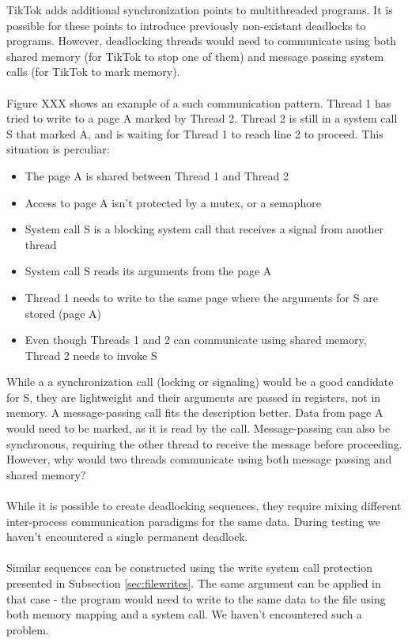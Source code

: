 \documentclass[conference]{IEEEtran}
\begin{document}
TikTok adds additional synchronization points to multithreaded programs. It is possible for these points to introduce 
previously non-existant deadlocks to programs. However, deadlocking threads would need to communicate using both 
shared memory (for TikTok to stop one of them) and message passing system calls (for TikTok to mark memory).
\\
\\
Figure XXX shows an example of a such communication pattern. Thread 1 has tried to write to a page A marked by Thread 2. 
Thread 2 is still in a system call S that marked A, and is waiting for Thread 1 to reach line 2 to proceed. This situation is
perculiar:
\begin{itemize}
    \item The page A is shared between Thread 1 and Thread 2
    \item Access to page A isn't protected by a mutex, or a semaphore
    \item System call S is a blocking system call that receives a signal from another thread
    \item System call S reads its arguments from the page A
    \item Thread 1 needs to write to the same page where the arguments for S are stored (page A)
    \item Even though Threads 1 and 2 can communicate using shared memory, Thread 2 needs to invoke S
\end{itemize}

While a a synchronization call (locking or signaling) would be a good candidate for S, they are lightweight and their arguments
are passed in registers, not in memory. A message-passing call fits the description better. Data from page A would need to be marked,
as it is read by the call. Message-passing can also be synchronous, requiring the other thread to receive the message before proceeding.
However, why would two threads communicate using both message passing and shared memory?
\\
\\
While it is possible to create deadlocking sequences, they require mixing different inter-process communication
paradigms for the same data. During testing we haven't encountered a single permanent deadlock.
\\
\\
Similar sequences can be constructed using the write system call protection presented in Subsection \ref{sec:filewrites}. The same argument
can be applied in that case - the program would need to write to the same data to the file using both memory mapping and a system call. We
haven't encountered such a problem.
\end{document}
